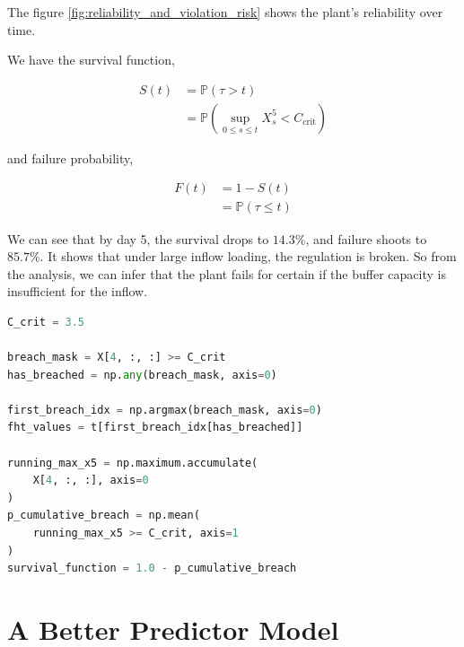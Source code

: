 \documentclass[conference]{IEEEtran}
\renewcommand{\bigskip}{\vspace{2\baselineskip}}
\renewcommand{\smallskip}{\vspace{0.5\baselineskip}}
\theoremstyle{definitionsc}
\theoremstyle{plainsc}
\theoremstyle{remarksc}
\begin{document}
The figure \ref{fig:reliability_and_violation_risk} shows the plant's reliability over time.

\smallskip

We have the survival function,

\begin{align*}
	S(t)&=\mathbb{P}(\tau>t)\\
	&=\mathbb{P}\left(\sup_{0\leq s\leq t}X_s^5<C_{\text{crit}}
\right)
\end{align*}

\smallskip

and failure probability,

\begin{align*}
	F(t) &= 1-S(t)\\
	&=\mathbb{P}(\tau \leq t)
\end{align*}



We can see that by day 5, the survival drops to $14.3\%$, and failure shoots to $85.7\%$. It shows that under large inflow loading, the regulation is broken. So from the analysis, we can infer that the plant fails for certain if the buffer capacity is insufficient for the inflow.






\begin{algorithm}[htbp]
\caption{First Hitting Time and Survival Evaluation}
\label{alg:fht_survival}
\begin{lstlisting}[language=Python]
C_crit = 3.5

breach_mask = X[4, :, :] >= C_crit
has_breached = np.any(breach_mask, axis=0)

first_breach_idx = np.argmax(breach_mask, axis=0)
fht_values = t[first_breach_idx[has_breached]]

running_max_x5 = np.maximum.accumulate(
    X[4, :, :], axis=0
)
p_cumulative_breach = np.mean(
    running_max_x5 >= C_crit, axis=1
)
survival_function = 1.0 - p_cumulative_breach
\end{lstlisting}
\end{algorithm}







\bigskip




\section{A Better Predictor Model}
\end{document}
